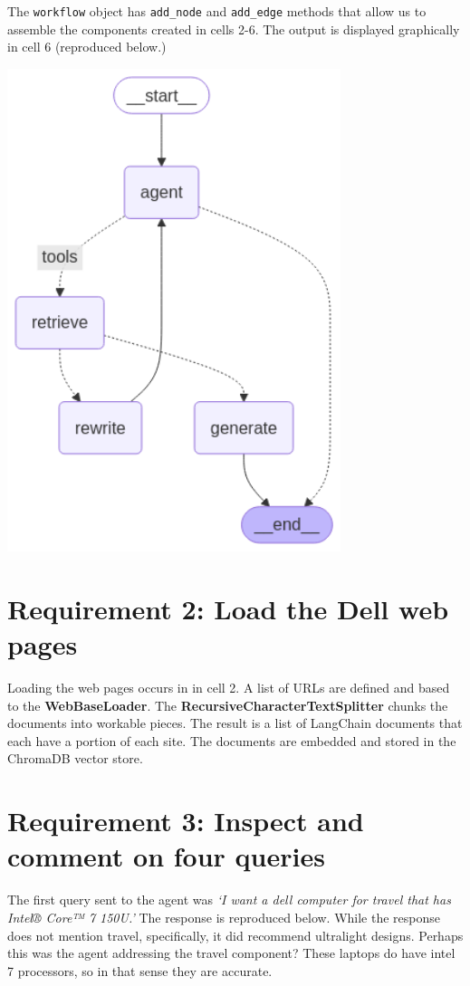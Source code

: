 \documentclass[11pt,letterpaper]{article}
\begin{document}
    The \texttt{workflow} object has \texttt{add\_node} and \texttt{add\_edge} methods that allow us to assemble the 
    components created in cells 2-6. The output is displayed graphically in cell 6 (reproduced below.)
    \begin{center}
        \includegraphics[height=400pt]{Assignment_02_NOTEBOOK_Geidel_5_0.png}
    \end{center}

    \clearpage

\section*{Requirement 2: Load the Dell web pages}
\tab Loading the web pages occurs in in cell 2. A list of URLs are defined and based to the \textbf{WebBaseLoader}.
The \textbf{RecursiveCharacterTextSplitter} chunks the documents into workable pieces. The result is a list of LangChain documents that each have
a portion of each site. The documents are embedded and stored in the ChromaDB vector store.

\section*{Requirement 3: Inspect and comment on four queries}
\tab The first query sent to the agent was \textit{`I want a dell computer for travel that has Intel® Core™ 7 150U.'} The response is reproduced below.
While the response does not mention travel, specifically, it did recommend ultralight designs. Perhaps this was the agent addressing the travel component?
These laptops do have intel 7 processors, so in that sense they are accurate.
\end{document}
